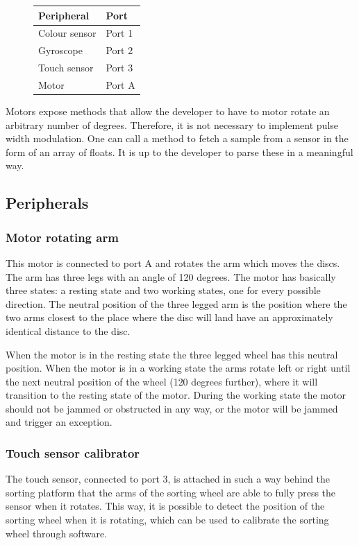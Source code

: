 \documentclass[a4paper,oneside,11pt]{article}
\begin{document}
\begin{figure}[H]
\begin{tabular}{|l|l|}
\hline
\textbf{Peripheral} & \textbf{Port} \\
\hline
Colour sensor & Port 1 \\
Gyroscope & Port 2 \\
Touch sensor & Port 3 \\
Motor & Port A \\
\hline
\end{tabular}
\end{figure}

Motors expose methods that allow the developer to have to motor rotate an arbitrary number of degrees. Therefore, it is not necessary to implement pulse width modulation. One can call a method to fetch a sample from a sensor in the form of an array of floats. It is up to the developer to parse these in a meaningful way.

\subsection{Peripherals}

\subsubsection{Motor rotating arm}
This motor is connected to port A and rotates the arm which moves the discs. The arm has three legs with an angle of 120 degrees. The motor has basically three states: a resting state and two working states, one for every possible direction. The neutral position of the three legged arm is the position where the two arms closest to the place where the disc will land have an approximately identical distance to the disc.

When the motor is in the resting state the three legged wheel has this neutral position. When the motor is in a working state the arms rotate left or right until the next neutral position of the wheel (120 degrees further), where it will transition to the resting state of the motor. During the working state the motor should not be jammed or obstructed in any way, or the motor will be jammed and trigger an exception.

\subsubsection{Touch sensor calibrator}
The touch sensor, connected to port 3, is attached in such a way behind the sorting platform that the arms of the sorting wheel are able to fully press the sensor when it rotates. This way, it is possible to detect the position of the sorting wheel when it is rotating, which can be used to calibrate the sorting wheel through software.
\end{document}
